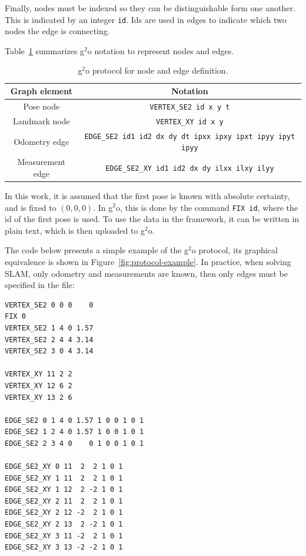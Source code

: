 Finally, nodes must be indexed so they can be distinguishable form one another. This is indicated by an integer \texttt{id}. Ids are used in edges to indicate which two nodes the edge is connecting.

Table~\ref{tab:protocol} summarizes g$^2$o notation to represent nodes and edges.

\begin{table}[htbp!]
    \centering
    \begin{tabular}{|c|c|}
        \hline
        Graph element & Notation\\
        \hline
        Pose node & \texttt{VERTEX\_SE2 id x y t}\\
        Landmark node & \texttt{VERTEX\_XY id x y}\\
        Odometry edge & \texttt{EDGE\_SE2 id1 id2 dx dy dt ipxx ipxy ipxt ipyy ipyt ipyy}\\
        Measurement edge & \texttt{EDGE\_SE2\_XY id1 id2 dx dy ilxx ilxy ilyy}\\
        \hline
    \end{tabular}
    \caption{g$^2$o protocol for node and edge definition.}
    \label{tab:protocol}
\end{table}

In this work, it is assumed that the first pose is known with absolute certainty, and is fixed to $(0,0,0)$. In g$^2$o, this is done by the command \texttt{FIX id}, where the id of the first pose is used. To use the data in the framework, it can be written in plain text, which is then uploaded to g$^2$o.

The code below presents a simple example of the g$^2$o protocol, its graphical equivalence is shown in Figure~\ref{fig:protocol-example}. In practice, when solving SLAM, only odometry and measurements are known, then only edges must be specified in the file:
 
\begin{lstlisting}[caption = g$^2$o protocol example, captionpos=b, basicstyle=\small]
VERTEX_SE2 0 0 0    0
FIX 0
VERTEX_SE2 1 4 0 1.57
VERTEX_SE2 2 4 4 3.14
VERTEX_SE2 3 0 4 3.14

VERTEX_XY 11 2 2
VERTEX_XY 12 6 2
VERTEX_XY 13 2 6

EDGE_SE2 0 1 4 0 1.57 1 0 0 1 0 1
EDGE_SE2 1 2 4 0 1.57 1 0 0 1 0 1
EDGE_SE2 2 3 4 0    0 1 0 0 1 0 1

EDGE_SE2_XY 0 11  2  2 1 0 1
EDGE_SE2_XY 1 11  2  2 1 0 1
EDGE_SE2_XY 1 12  2 -2 1 0 1
EDGE_SE2_XY 2 11  2  2 1 0 1
EDGE_SE2_XY 2 12 -2  2 1 0 1
EDGE_SE2_XY 2 13  2 -2 1 0 1
EDGE_SE2_XY 3 11 -2  2 1 0 1
EDGE_SE2_XY 3 13 -2 -2 1 0 1
\end{lstlisting}

